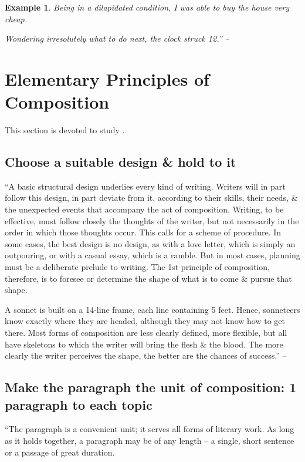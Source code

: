 \documentclass[oneside]{book}
\numberwithin{equation}{section}
\newtheorem{example}{Example}[chapter]
\begin{document}
\begin{example}
	Being in a dilapidated condition, I was able to buy the house very cheap.
	
	Wondering irresolutely what to do next, the clock struck 12.'' -- \cite[Chap. 1, Sect. 11, p. 27]{Strunk_White2019}
\end{example}

\section{Elementary Principles of Composition}
This section is devoted to study \cite[Chap. 2]{Strunk_White2019}.

\subsection{Choose a suitable design \& hold to it}
``A basic structural design underlies every kind of writing. Writers will in part follow this design, in part deviate from it, according to their skills, their needs, \& the unexpected events that accompany the act of composition. Writing, to be effective, must follow closely the thoughts of the writer, but not necessarily in the order in which those  thoughts occur. This calls for a scheme of procedure. In some cases, the best design is no design, as with a love letter, which is simply an outpouring, or with a casual essay, which is a ramble. But in most cases, planning must be a deliberate prelude to writing. The 1st principle of composition, therefore, is to foresee or determine the shape of what is to come \& pursue that shape.

A sonnet is built on a 14-line frame, each line containing 5 feet. Hence, sonneteers know exactly where they are headed, although they may not know how to get there. Most forms of composition are less clearly defined, more flexible, but all have skeletons to which the writer will bring the flesh \& the blood. The more clearly the writer perceives the shape, the better are the chances of success.'' --  \cite[Chap. 2, Sect. 12, p. 29]{Strunk_White2019}

\subsection{Make the paragraph the unit of composition: 1 paragraph to each topic}
``The paragraph is a convenient unit; it serves all forms of literary work. As long as it holds together, a paragraph may be of any length -- a single, short sentence or a passage of great duration.
\end{document}
